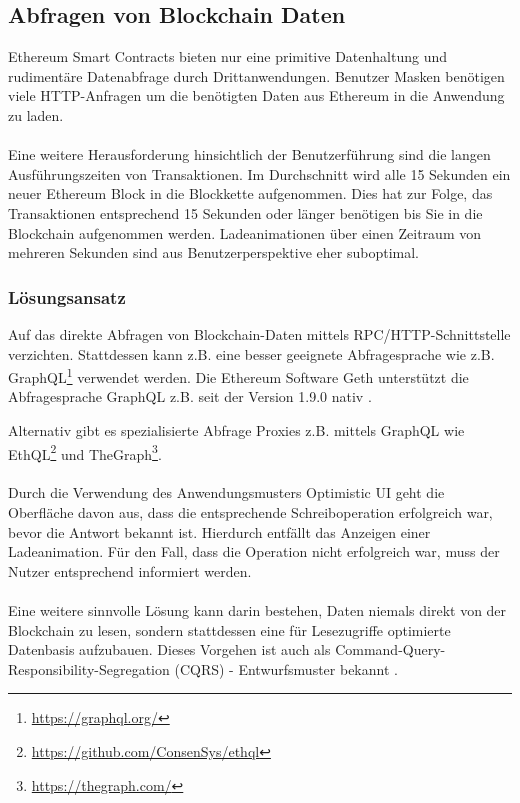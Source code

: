 \subsection*{Abfragen von Blockchain Daten}
Ethereum Smart Contracts bieten nur eine primitive Datenhaltung und rudimentäre Datenabfrage durch Drittanwendungen. 
Benutzer Masken benötigen viele HTTP-Anfragen um die benötigten Daten aus Ethereum in die Anwendung zu laden. 

\paragraph*{}
Eine weitere Herausforderung hinsichtlich der Benutzerführung sind die langen Ausführungszeiten von Transaktionen. Im Durchschnitt wird alle 15 Sekunden ein neuer Ethereum Block in die Blockkette aufgenommen. Dies hat zur Folge, das Transaktionen entsprechend 15 Sekunden oder länger benötigen bis Sie in die Blockchain aufgenommen werden. Ladeanimationen über einen Zeitraum von  mehreren Sekunden sind aus Benutzerperspektive eher suboptimal.

\subsubsection*{Lösungsansatz}
Auf das direkte Abfragen von Blockchain-Daten mittels RPC/HTTP-Schnittstelle verzichten. Stattdessen kann z.B. eine besser geeignete Abfragesprache wie z.B. GraphQL\footnote{\url{https://graphql.org/}} verwendet werden. Die Ethereum Software Geth unterstützt die Abfragesprache GraphQL z.B. seit der Version 1.9.0 nativ \cite{geth}.

Alternativ gibt es spezialisierte Abfrage Proxies z.B. mittels GraphQL wie EthQL\footnote{\url{https://github.com/ConsenSys/ethql}} und TheGraph\footnote{\url{https://thegraph.com/}}.

\paragraph*{}
Durch die Verwendung des Anwendungsmusters Optimistic UI geht die Oberfläche davon aus, dass die entsprechende Schreiboperation erfolgreich war, bevor die Antwort bekannt ist. \cite{optimisticui} Hierdurch entfällt das Anzeigen einer Ladeanimation. Für den Fall, dass die Operation nicht erfolgreich war, muss der Nutzer entsprechend informiert werden.

\paragraph*{}
Eine weitere sinnvolle Lösung kann darin bestehen, Daten niemals direkt von der Blockchain zu lesen, sondern stattdessen eine für Lesezugriffe optimierte Datenbasis aufzubauen. Dieses Vorgehen ist auch als Command-Query-Responsibility-Segregation (CQRS) - Entwurfsmuster bekannt \cite{cqrs}. 



